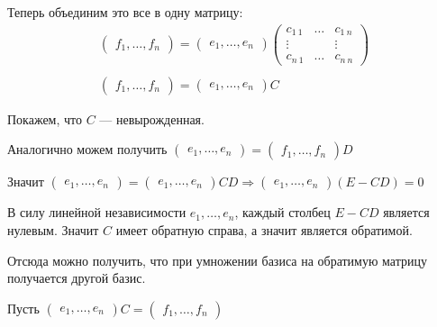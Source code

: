 Теперь объединим это все в одну матрицу:
\begin{gather*}
    \begin{pmatrix}
        f_1, \ldots, f_n
    \end{pmatrix}
    =
    \begin{pmatrix}
        e_1, \ldots, e_n
    \end{pmatrix}
    \begin{pmatrix}
        c_{1 \: 1} & \ldots & c_{1 \: n}
        \\
        \vdots & & \vdots
        \\
        c_{n \: 1} & \ldots & c_{n \: n}
    \end{pmatrix}
    \\
    \\
    \begin{pmatrix}
        f_1, \ldots, f_n
    \end{pmatrix}
    =
    \begin{pmatrix}
        e_1, \ldots, e_n
    \end{pmatrix}
    C
\end{gather*}

Покажем, что \( C \) --- невырожденная.

Аналогично можем получить
\(
    \begin{pmatrix}
        e_1, \ldots, e_n
    \end{pmatrix}
    =
    \begin{pmatrix}
        f_1, \ldots, f_n
    \end{pmatrix}
    D
\)

Значит
\(
    \begin{pmatrix}
        e_1, \ldots, e_n
    \end{pmatrix}
    =
    \begin{pmatrix}
        e_1, \ldots, e_n
    \end{pmatrix}
    CD
    \Rightarrow
    \begin{pmatrix}
        e_1, \ldots, e_n
    \end{pmatrix}
    (E - CD)
    = 0
\)

В силу линейной независимости \( e_1, \ldots, e_n \),
каждый столбец \( E - CD \) является нулевым.
Значит \( C \) имеет обратную справа, а значит является обратимой.

Отсюда можно получить, что при умножении базиса на обратимую матрицу получается другой базис.

Пусть
\(
    \begin{pmatrix}
        e_1, \ldots, e_n
    \end{pmatrix}
    C
    =
    \begin{pmatrix}
        f_1, \ldots, f_n
    \end{pmatrix}
\)

